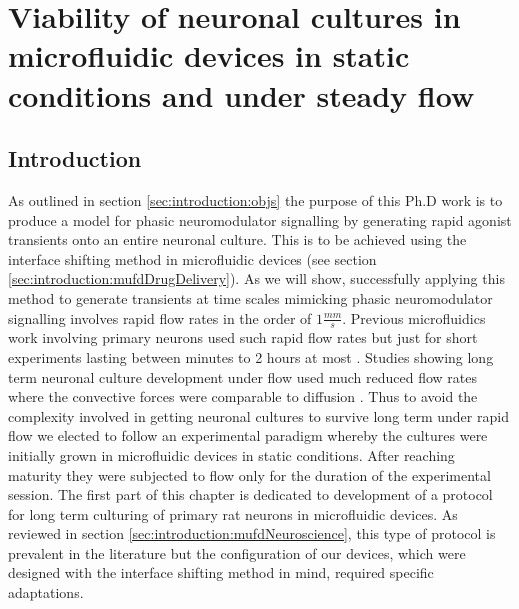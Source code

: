 \chapter{Viability of neuronal cultures in microfluidic devices in static conditions and under steady flow}
\label{chap:devicesAndFlow}


\section{Introduction}
\label{sec:devices:introduction}
As outlined in section \ref{sec:introduction:objs} the purpose of this Ph.D work is to produce a model for phasic neuromodulator signalling by generating rapid agonist transients onto an entire neuronal culture. This is to be achieved using the interface shifting method in microfluidic devices (see section \ref{sec:introduction:mufdDrugDelivery}). As we will show, successfully applying this method to generate transients at time scales mimicking phasic neuromodulator signalling involves rapid flow rates in the order of \(1\frac{mm}{s}\). Previous microfluidics work involving primary neurons used such rapid flow rates but just for short experiments lasting between minutes to 2 hours at most \cite{biffi2012microfluidic,morel2012amplification,wang2008microfluidics,pearce2005integrated}. Studies showing long term neuronal culture development under flow used much reduced flow rates where the convective forces were comparable to diffusion \cite{choi2013neurotoxic,millet2007microfluidic,park2015three,kumamoto2015effects}. Thus to avoid the complexity involved in getting neuronal cultures to survive long term under rapid flow we elected to follow an experimental paradigm whereby the cultures were initially grown in microfluidic devices in static conditions. After reaching maturity they were subjected to flow only for the duration of the experimental session. The first part of this chapter is dedicated to development of a protocol for long term culturing of primary rat neurons in microfluidic devices. As reviewed in section \ref{sec:introduction:mufdNeuroscience}, this type of protocol is prevalent in the literature but the configuration of our devices, which were designed with the interface shifting method in mind, required specific adaptations.

